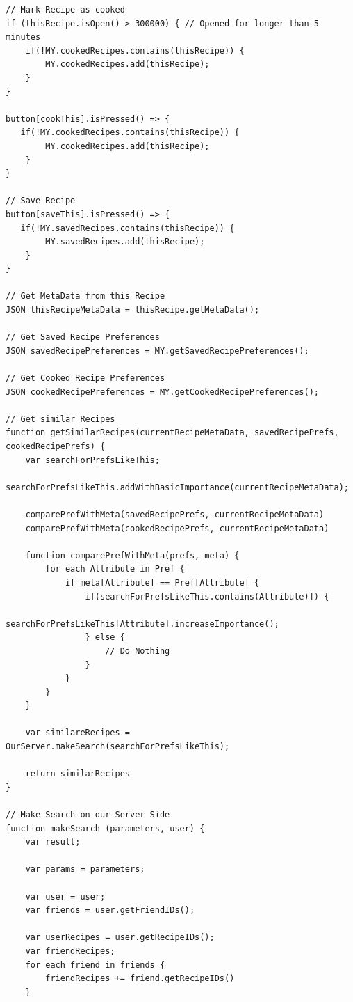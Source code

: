 \begin{lstlisting}[caption=Pseudocode - Ähnliche Rezepte,label={lst:SimilarRecipies}]
// Mark Recipe as cooked
if (thisRecipe.isOpen() > 300000) { // Opened for longer than 5 minutes
    if(!MY.cookedRecipes.contains(thisRecipe)) { 
        MY.cookedRecipes.add(thisRecipe);
    }
}

button[cookThis].isPressed() => {
   if(!MY.cookedRecipes.contains(thisRecipe)) {
        MY.cookedRecipes.add(thisRecipe);
    }
}

// Save Recipe
button[saveThis].isPressed() => {
   if(!MY.savedRecipes.contains(thisRecipe)) {
        MY.savedRecipes.add(thisRecipe);
    }
}

// Get MetaData from this Recipe
JSON thisRecipeMetaData = thisRecipe.getMetaData();

// Get Saved Recipe Preferences
JSON savedRecipePreferences = MY.getSavedRecipePreferences();

// Get Cooked Recipe Preferences
JSON cookedRecipePreferences = MY.getCookedRecipePreferences();

// Get similar Recipes
function getSimilarRecipes(currentRecipeMetaData, savedRecipePrefs, cookedRecipePrefs) {
    var searchForPrefsLikeThis;
    searchForPrefsLikeThis.addWithBasicImportance(currentRecipeMetaData);

    comparePrefWithMeta(savedRecipePrefs, currentRecipeMetaData)
    comparePrefWithMeta(cookedRecipePrefs, currentRecipeMetaData)
    
    function comparePrefWithMeta(prefs, meta) {
        for each Attribute in Pref {
            if meta[Attribute] == Pref[Attribute] {
                if(searchForPrefsLikeThis.contains(Attribute)]) {
                    searchForPrefsLikeThis[Attribute].increaseImportance();
                } else {
                    // Do Nothing
                }
            }
        }
    }

    var similareRecipes = OurServer.makeSearch(searchForPrefsLikeThis);

    return similarRecipes
}

// Make Search on our Server Side
function makeSearch (parameters, user) {
    var result;

    var params = parameters;

    var user = user;
    var friends = user.getFriendIDs();
    
    var userRecipes = user.getRecipeIDs();
    var friendRecipes;
    for each friend in friends {
        friendRecipes += friend.getRecipeIDs()
    }


\end{lstlisting}
